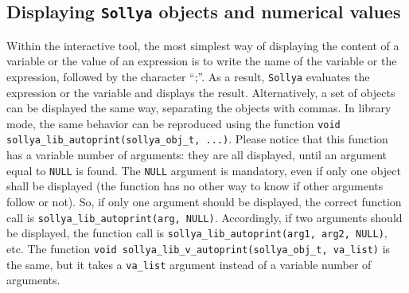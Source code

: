 \documentclass[a4paper]{article}
\newcommand{\sollya}{\texttt{Sollya}\xspace}
\begin{document}
\subsection{Displaying \sollya objects and numerical values}
Within the interactive tool, the most simplest way of displaying the content of a variable or the value of an expression is to write the name of the variable or the expression, followed by the character ``;''. As a result, \sollya evaluates the expression or the variable and displays the result. Alternatively, a set of objects can be displayed the same way, separating the objects with commas. In library mode, the same behavior can be reproduced using the function \verb|void sollya_lib_autoprint(sollya_obj_t, ...)|. Please notice that this function has a variable number of arguments: they are all displayed, until an argument equal to \verb|NULL| is found. The \verb|NULL| argument is mandatory, even if only one object shall be displayed (the function has no other way to know if other arguments follow or not). So, if only one argument should be displayed, the correct function call is \verb|sollya_lib_autoprint(arg, NULL)|. Accordingly, if two arguments should be displayed, the function call is \verb|sollya_lib_autoprint(arg1, arg2, NULL)|, etc. The function \verb|void sollya_lib_v_autoprint(sollya_obj_t, va_list)| is the same, but it takes a \verb|va_list| argument instead of a variable number of arguments.
\end{document}
